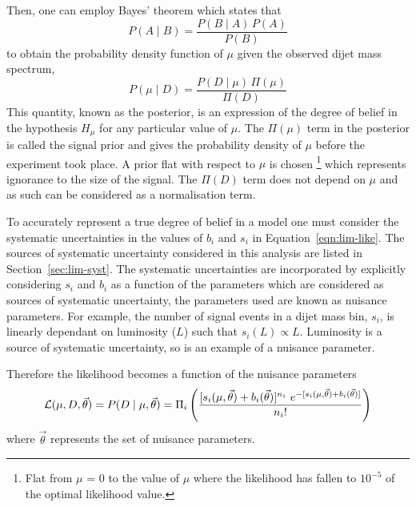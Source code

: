 \noindent
Then, one can employ Bayes' theorem which states that
\begin{equation}
  P(A \mid B) = \frac{P(B \mid A) \, P(A)}{P(B)}
\end{equation}
to obtain the probability density function of $\mu$ given the observed dijet mass spectrum,
\begin{equation}
  P(\mu \mid D) = \frac{ P(D \mid \mu) \, \Pi( \mu ) }{ \Pi( D ) }
  \label{eq:lim-conf_statOnly}
\end{equation}
This quantity, known as the posterior, is an expression of the degree of belief in the hypothesis
$H_\mu$ for any particular value of $\mu$.
The $\Pi( \mu )$ term in the posterior %
is called the signal prior
and gives the probability density of $\mu$ before the experiment took place.
A prior flat with respect to $\mu$ is chosen
\footnote{Flat from $\mu$ = 0 to the value of $\mu$ where the
likelihood has fallen to $10^{-5}$ of the optimal likelihood value.}
which represents ignorance to the size of the signal.
The $\Pi(D)$ term does not depend on $\mu$ and as such can be considered as a normalisation term.

To accurately represent a true degree of belief in a model one must consider the systematic uncertainties
in the values of $b_i$ and $s_i$ in Equation~\ref{eqn:lim-like}.
The sources of systematic uncertainty considered in this analysis are listed in Section~\ref{sec:lim-syst}.
The systematic uncertainties are incorporated by explicitly considering $s_i$ and $b_i$ as a
function of the parameters which are considered as sources of systematic uncertainty,
the parameters used are known as nuisance parameters.
For example, the number of signal events in a dijet mass bin, $s_i$, is linearly dependant on luminosity ($L$) such that $s_i(L) \propto L$.
Luminosity is a source of systematic uncertainty, so is an example of a nuisance parameter.

Therefore the likelihood becomes a function of the nuisance parameters
\begin{equation}
  \mathcal{L} (\mu,D,\vec{\theta}) = P(D \mid \mu, \vec{\theta} ) =  \Pi_i \left( \frac{[s_i(\mu,\vec{\theta})+b_i(\vec{\theta})]^{n_i}~e^{-[s_i(\mu,\vec{\theta})+b_i(\vec{\theta})]}}{n_i!} \right)
\end{equation}
where $\vec{\theta}$ represents the set of nuisance parameters.

